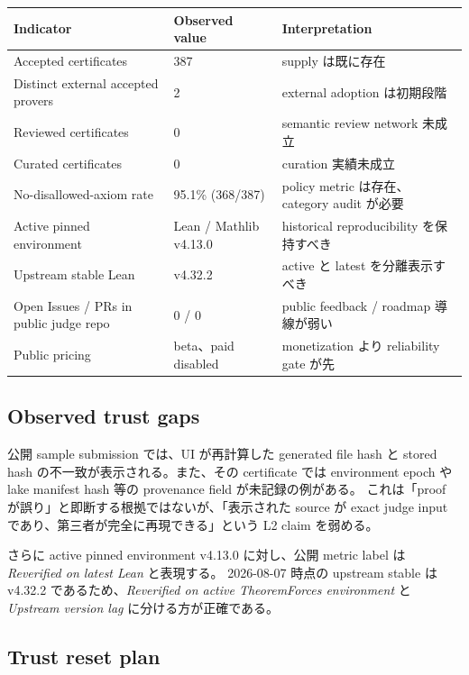 \documentclass[a4paper,11pt]{ltjsarticle}
\begin{document}
\begin{tabularx}{0.96\linewidth}{L{54mm}L{35mm}Y}
\toprule
\textbf{Indicator} & \textbf{Observed value} & \textbf{Interpretation} \\
\midrule
Accepted certificates & 387 & supply は既に存在 \\
Distinct external accepted provers & 2 & external adoption は初期段階 \\
Reviewed certificates & 0 & semantic review network 未成立 \\
Curated certificates & 0 & curation 実績未成立 \\
No-disallowed-axiom rate & 95.1\% (368/387) & policy metric は存在、category audit が必要 \\
Active pinned environment & Lean / Mathlib v4.13.0 & historical reproducibility を保持すべき \\
Upstream stable Lean & v4.32.2 & active と latest を分離表示すべき \\
Open Issues / PRs in public judge repo & 0 / 0 & public feedback / roadmap 導線が弱い \\
Public pricing & beta、paid disabled & monetization より reliability gate が先 \\
\bottomrule
\end{tabularx}

\subsection{Observed trust gaps}

公開 sample submission では、UI が再計算した generated file hash と stored hash の不一致が表示される。また、その certificate では
environment epoch や lake manifest hash 等の provenance field が未記録の例がある\cite{tfsample,tfsamplecert}。
これは「proof が誤り」と即断する根拠ではないが、「表示された source が exact judge input であり、第三者が完全に再現できる」という
L2 claim を弱める。

さらに active pinned environment v4.13.0 に対し、公開 metric label は \textit{Reverified on latest Lean} と表現する。
2026-08-07 時点の upstream stable は v4.32.2 であるため、\textit{Reverified on active TheoremForces environment} と
\textit{Upstream version lag} に分ける方が正確である\cite{tfmetrics,leanreleases}。

\subsection{Trust reset plan}
\end{document}
